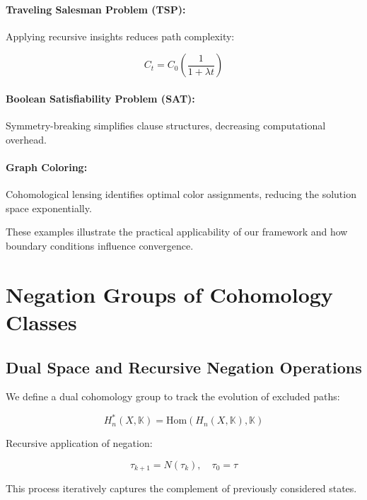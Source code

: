 \documentclass{article}
\begin{document}
\paragraph{Traveling Salesman Problem (TSP):}

Applying recursive insights reduces path complexity:

\begin{equation}
C_t = C_0 \left( \frac{1}{1 + \lambda t} \right)
\end{equation}

\paragraph{Boolean Satisfiability Problem (SAT):}

Symmetry-breaking simplifies clause structures, decreasing computational overhead.

\paragraph{Graph Coloring:}

Cohomological lensing identifies optimal color assignments, reducing the solution space exponentially.

These examples illustrate the practical applicability of our framework and how boundary conditions influence convergence.

\section{Negation Groups of Cohomology Classes}

\subsection{Dual Space and Recursive Negation Operations}

We define a dual cohomology group to track the evolution of excluded paths:

\begin{equation}
H_n^*(X, \mathbb{K}) = \text{Hom}(H_n(X, \mathbb{K}), \mathbb{K})
\end{equation}

Recursive application of negation:

\begin{equation}
\tau_{k+1} = N(\tau_k), \quad \tau_0 = \tau
\end{equation}

This process iteratively captures the complement of previously considered states.
\end{document}
